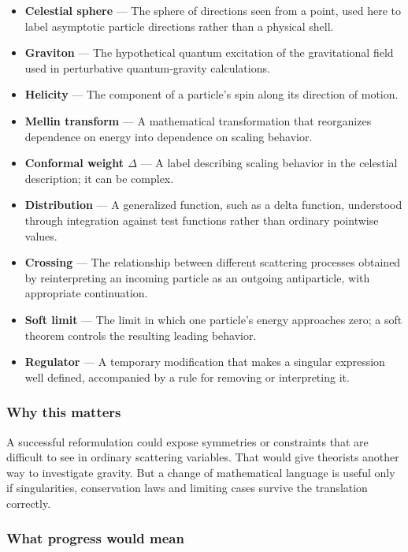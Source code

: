 \documentclass[
  11pt,
]{article}
\begin{document}
\begin{itemize}
\item
  \textbf{Celestial sphere} --- The sphere of directions seen from a
  point, used here to label asymptotic particle directions rather than a
  physical shell.
\item
  \textbf{Graviton} --- The hypothetical quantum excitation of the
  gravitational field used in perturbative quantum-gravity calculations.
\item
  \textbf{Helicity} --- The component of a particle's spin along its
  direction of motion.
\item
  \textbf{Mellin transform} --- A mathematical transformation that
  reorganizes dependence on energy into dependence on scaling behavior.
\item
  \textbf{Conformal weight \ensuremath{\Delta}} --- A label describing
  scaling behavior in the celestial description; it can be complex.
\item
  \textbf{Distribution} --- A generalized function, such as a delta
  function, understood through integration against test functions rather
  than ordinary pointwise values.
\item
  \textbf{Crossing} --- The relationship between different scattering
  processes obtained by reinterpreting an incoming particle as an
  outgoing antiparticle, with appropriate continuation.
\item
  \textbf{Soft limit} --- The limit in which one particle's energy
  approaches zero; a soft theorem controls the resulting leading
  behavior.
\item
  \textbf{Regulator} --- A temporary modification that makes a singular
  expression well defined, accompanied by a rule for removing or
  interpreting it.
\end{itemize}

\subsubsection{Why this matters}

A successful reformulation could expose symmetries or constraints that
are difficult to see in ordinary scattering variables. That would give
theorists another way to investigate gravity. But a change of
mathematical language is useful only if singularities, conservation laws
and limiting cases survive the translation correctly.

\subsubsection{What progress would mean}
\end{document}
